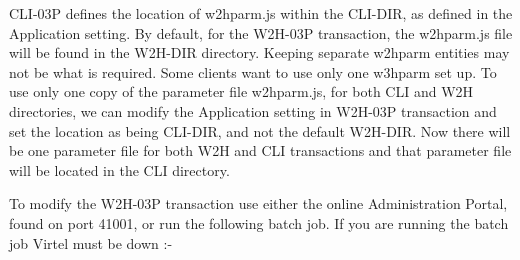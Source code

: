 \documentclass[letterpaper,10pt,english]{sphinxmanual}
\begin{document}
CLI-03P defines the location of w2hparm.js within the CLI-DIR, as defined in the Application setting. By default, for the W2H-03P transaction, the w2hparm.js file will be found in the W2H-DIR directory. Keeping separate w2hparm entities may not be what is required. Some clients want to use only one w3hparm set up. To use only one copy of the parameter file w2hparm.js, for both CLI and W2H directories, we can modify the Application setting in W2H-03P transaction and set the location as being CLI-DIR, and not the default W2H-DIR. Now there will be one parameter file for both W2H and CLI transactions and that parameter file will be located in the CLI directory.

To modify the W2H-03P transaction use either the online Administration Portal, found on port 41001, or run the following batch job. If you are running the batch job Virtel must be down :-

\begin{sphinxVerbatim}[commandchars=\\\{\}]
  
  
   
    
   
   
    
       
          
\end{sphinxVerbatim}
\end{document}

